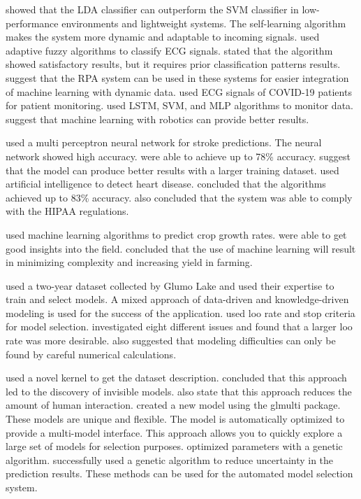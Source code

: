 \documentclass[a4paper,fleqn]{cas-dc}
\begin{document}
\cite*{06_rp} showed that the LDA classifier can outperform the SVM classifier in low-performance environments and lightweight systems. The self-learning algorithm makes the system more dynamic and adaptable to incoming signals. \cite*{14_rp} used adaptive fuzzy algorithms to classify ECG signals. \citeauthor{14_rp} stated that the algorithm showed satisfactory results, but it requires prior classification patterns results. \cite*{ref_paper_self_rpa} suggest that the RPA system can be used in these systems for easier integration of machine learning with dynamic data. \cite*{21_rp} used ECG signals of COVID-19 patients for patient monitoring. \citeauthor{21_rp} used LSTM, SVM, and MLP algorithms to monitor data. \citeauthor{21_rp} suggest that machine learning with robotics can provide better results.

\cite*{07_rp} used a multi perceptron neural network for stroke predictions. The neural network showed high accuracy. \citeauthor{07_rp} were able to achieve up to 78\% accuracy. \citeauthor{07_rp} suggest that the model can produce better results with a larger training dataset. \cite*{05_rp} used artificial intelligence to detect heart disease. \citeauthor{05_rp} concluded that the algorithms achieved up to 83\% accuracy. \citeauthor{05_rp} also concluded that the system was able to comply with the HIPAA regulations.

\cite*{ref_paper_m3} used machine learning algorithms to predict crop growth rates. \citeauthor{ref_paper_m3} were able to get good insights into the field. \citeauthor{ref_paper_m3} concluded that the use of machine learning will result in minimizing complexity and increasing yield in farming.

\cite*{01_rp} used a two-year dataset collected by Glumo Lake and used their expertise to train and select models. A mixed approach of data-driven and knowledge-driven modeling is used for the success of the application. \cite*{13_rp} used loo rate and stop criteria for model selection. \citeauthor{13_rp} investigated eight different issues and found that a larger loo rate was more desirable. \citeauthor{13_rp} also suggested that modeling difficulties can only be found by careful numerical calculations.

\cite*{17_rp} used a novel kernel to get the dataset description. \citeauthor{17_rp} concluded that this approach led to the discovery of invisible models. \citeauthor{17_rp} also state that this approach reduces the amount of human interaction. \cite*{04_rp} created a new model using the glmulti package. These models are unique and flexible. The model is automatically optimized to provide a multi-model interface. This approach allows you to quickly explore a large set of models for selection purposes. \cite*{08_rp} optimized parameters with a genetic algorithm. \citeauthor{08_rp} successfully used a genetic algorithm to reduce uncertainty in the prediction results. These methods can be used for the automated model selection system.
\end{document}
